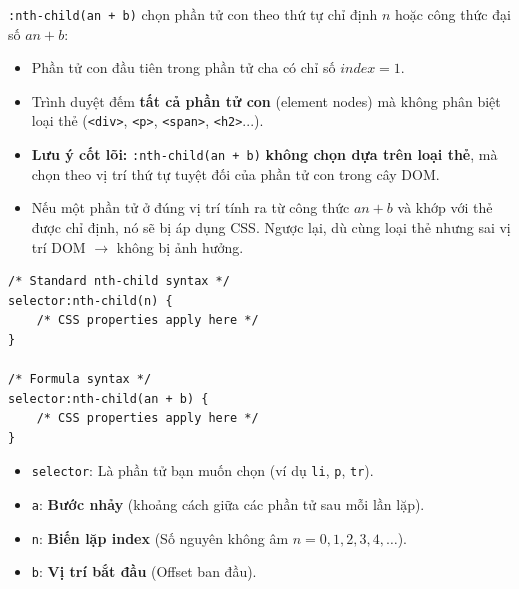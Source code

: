 \documentclass[11pt,oneside]{book}
\newcommand{\codeinline}[1]{\textcolor{accentOrange}{\texttt{#1}}}
\begin{document}
\begin{conceptBox}
\codeinline{:nth-child(an + b)} chọn phần tử con theo thứ tự chỉ định $n$ hoặc công thức đại số $an + b$:
\begin{itemize}[leftmargin=1.5em, itemsep=2pt, parsep=0pt]
    \item Phần tử con đầu tiên trong phần tử cha có chỉ số $index = 1$.
    \item Trình duyệt đếm \textbf{tất cả phần tử con} (element nodes) mà không phân biệt loại thẻ (\codeinline{<div>}, \codeinline{<p>}, \codeinline{<span>}, \codeinline{<h2>}...).
    \item \textbf{Lưu ý cốt lõi:} \codeinline{:nth-child(an + b)} \textbf{không chọn dựa trên loại thẻ}, mà chọn theo vị trí thứ tự tuyệt đối của phần tử con trong cây DOM.
    \item Nếu một phần tử ở đúng vị trí tính ra từ công thức $an + b$ và khớp với thẻ được chỉ định, nó sẽ bị áp dụng CSS. Ngược lại, dù cùng loại thẻ nhưng sai vị trí DOM $\rightarrow$ không bị ảnh hưởng.
\end{itemize}
\end{conceptBox}

\begin{codeWindow}
\begin{lstlisting}[language=CSS3]
/* Standard nth-child syntax */
selector:nth-child(n) {
    /* CSS properties apply here */
}

/* Formula syntax */
selector:nth-child(an + b) {
    /* CSS properties apply here */
}
\end{lstlisting}
\end{codeWindow}

\begin{conceptBox}
\begin{itemize}[leftmargin=1.5em, itemsep=2pt, parsep=0pt]
    \item \codeinline{selector}: Là phần tử bạn muốn chọn (ví dụ \codeinline{li}, \codeinline{p}, \codeinline{tr}).
    \item \codeinline{a}: \textbf{Bước nhảy} (khoảng cách giữa các phần tử sau mỗi lần lặp).
    \item \codeinline{n}: \textbf{Biến lặp index} (Số nguyên không âm $n = 0, 1, 2, 3, 4, \dots$).
    \item \codeinline{b}: \textbf{Vị trí bắt đầu} (Offset ban đầu).
\end{itemize}
\end{conceptBox}
\end{document}
